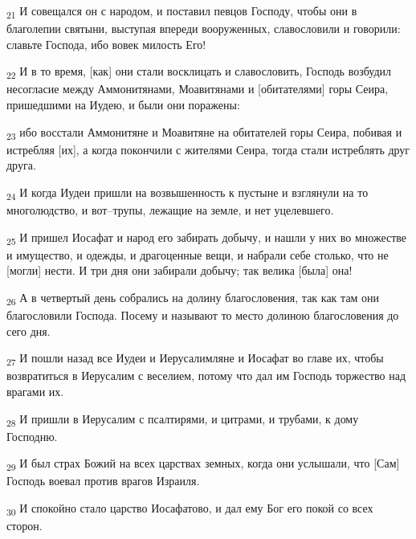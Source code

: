 \begin{tcolorbox}
\textsubscript{21} И совещался он с народом, и поставил певцов Господу, чтобы они в благолепии святыни, выступая впереди вооруженных, славословили и говорили: славьте Господа, ибо вовек милость Его!
\end{tcolorbox}
\begin{tcolorbox}
\textsubscript{22} И в то время, [как] они стали восклицать и славословить, Господь возбудил несогласие между Аммонитянами, Моавитянами и [обитателями] горы Сеира, пришедшими на Иудею, и были они поражены:
\end{tcolorbox}
\begin{tcolorbox}
\textsubscript{23} ибо восстали Аммонитяне и Моавитяне на обитателей горы Сеира, побивая и истребляя [их], а когда покончили с жителями Сеира, тогда стали истреблять друг друга.
\end{tcolorbox}
\begin{tcolorbox}
\textsubscript{24} И когда Иудеи пришли на возвышенность к пустыне и взглянули на то многолюдство, и вот--трупы, лежащие на земле, и нет уцелевшего.
\end{tcolorbox}
\begin{tcolorbox}
\textsubscript{25} И пришел Иосафат и народ его забирать добычу, и нашли у них во множестве и имущество, и одежды, и драгоценные вещи, и набрали себе столько, что не [могли] нести. И три дня они забирали добычу; так велика [была] она!
\end{tcolorbox}
\begin{tcolorbox}
\textsubscript{26} А в четвертый день собрались на долину благословения, так как там они благословили Господа. Посему и называют то место долиною благословения до сего дня.
\end{tcolorbox}
\begin{tcolorbox}
\textsubscript{27} И пошли назад все Иудеи и Иерусалимляне и Иосафат во главе их, чтобы возвратиться в Иерусалим с веселием, потому что дал им Господь торжество над врагами их.
\end{tcolorbox}
\begin{tcolorbox}
\textsubscript{28} И пришли в Иерусалим с псалтирями, и цитрами, и трубами, к дому Господню.
\end{tcolorbox}
\begin{tcolorbox}
\textsubscript{29} И был страх Божий на всех царствах земных, когда они услышали, что [Сам] Господь воевал против врагов Израиля.
\end{tcolorbox}
\begin{tcolorbox}
\textsubscript{30} И спокойно стало царство Иосафатово, и дал ему Бог его покой со всех сторон.
\end{tcolorbox}
